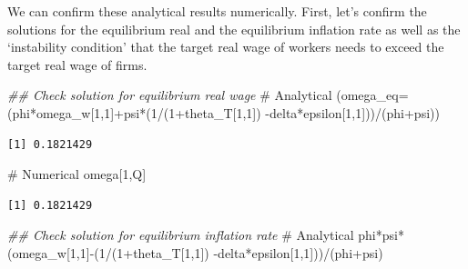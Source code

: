 \documentclass[
  letterpaper,
  DIV=11,
  numbers=noendperiod]{scrreprt}
\newenvironment{Shaded}{\begin{snugshade}}{\end{snugshade}}
\newcommand{\AttributeTok}[1]{\textcolor[rgb]{0.40,0.45,0.13}{#1}}
\newcommand{\CommentTok}[1]{\textcolor[rgb]{0.37,0.37,0.37}{#1}}
\newcommand{\DecValTok}[1]{\textcolor[rgb]{0.68,0.00,0.00}{#1}}
\newcommand{\DocumentationTok}[1]{\textcolor[rgb]{0.37,0.37,0.37}{\textit{#1}}}
\newcommand{\NormalTok}[1]{\textcolor[rgb]{0.00,0.23,0.31}{#1}}
\newcommand{\SpecialCharTok}[1]{\textcolor[rgb]{0.37,0.37,0.37}{#1}}
\begin{document}
We can confirm these analytical results numerically. First, let's
confirm the solutions for the equilibrium real and the equilibrium
inflation rate as well as the `instability condition' that the target
real wage of workers needs to exceed the target real wage of firms.

\begin{Shaded}
\begin{Highlighting}[]
\DocumentationTok{\#\# Check solution for equilibrium real wage}
\CommentTok{\# Analytical}
\NormalTok{(}\AttributeTok{omega\_eq=}\NormalTok{ (phi}\SpecialCharTok{*}\NormalTok{omega\_w[}\DecValTok{1}\NormalTok{,}\DecValTok{1}\NormalTok{]}\SpecialCharTok{+}\NormalTok{psi}\SpecialCharTok{*}\NormalTok{(}\DecValTok{1}\SpecialCharTok{/}\NormalTok{(}\DecValTok{1}\SpecialCharTok{+}\NormalTok{theta\_T[}\DecValTok{1}\NormalTok{,}\DecValTok{1}\NormalTok{]) }\SpecialCharTok{{-}}\NormalTok{delta}\SpecialCharTok{*}\NormalTok{epsilon[}\DecValTok{1}\NormalTok{,}\DecValTok{1}\NormalTok{]))}\SpecialCharTok{/}\NormalTok{(phi}\SpecialCharTok{+}\NormalTok{psi))}
\end{Highlighting}
\end{Shaded}

\begin{verbatim}
[1] 0.1821429
\end{verbatim}

\begin{Shaded}
\begin{Highlighting}[]
\CommentTok{\# Numerical}
\NormalTok{omega[}\DecValTok{1}\NormalTok{,Q]}
\end{Highlighting}
\end{Shaded}

\begin{verbatim}
[1] 0.1821429
\end{verbatim}

\begin{Shaded}
\begin{Highlighting}[]
\DocumentationTok{\#\# Check solution for equilibrium inflation rate}
\CommentTok{\# Analytical}
\NormalTok{phi}\SpecialCharTok{*}\NormalTok{psi}\SpecialCharTok{*}\NormalTok{(omega\_w[}\DecValTok{1}\NormalTok{,}\DecValTok{1}\NormalTok{]}\SpecialCharTok{{-}}\NormalTok{(}\DecValTok{1}\SpecialCharTok{/}\NormalTok{(}\DecValTok{1}\SpecialCharTok{+}\NormalTok{theta\_T[}\DecValTok{1}\NormalTok{,}\DecValTok{1}\NormalTok{]) }\SpecialCharTok{{-}}\NormalTok{delta}\SpecialCharTok{*}\NormalTok{epsilon[}\DecValTok{1}\NormalTok{,}\DecValTok{1}\NormalTok{]))}\SpecialCharTok{/}\NormalTok{(phi}\SpecialCharTok{+}\NormalTok{psi)}
\end{Highlighting}
\end{Shaded}
\end{document}
